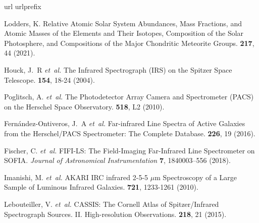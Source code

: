 \documentclass{nature2}
\begin{document}
\begin{thebibliography}{100}
\setcounter{enumiv}{45}

\expandafter\ifx\csname url\endcsname\relax
  \def\url#1{\texttt{#1}}\fi
\expandafter\ifx\csname urlprefix\endcsname\relax\def\urlprefix{URL }\fi
\providecommand{\bibinfo}[2]{#2}
\providecommand{\eprint}[2][]{\url{#2}}

\bibinfo{author}{Lodders, K.}
\newblock Relative Atomic Solar System Abundances, Mass Fractions, and Atomic Masses of the Elements and Their Isotopes, Composition of the Solar Photosphere, and Compositions of the Major Chondritic Meteorite Groups.
\newblock \emph{\bibinfo{journal}{\ssr}} \textbf{\bibinfo{volume}{217}},
  \bibinfo{pages}{44} (\bibinfo{year}{2021}).
  
\bibinfo{author}{{Houck}, J.~R} \emph{et~al.}
\newblock The Infrared Spectrograph (IRS) on the Spitzer Space Telescope.
\newblock \emph{\bibinfo{journal}{\apjs}} \textbf{\bibinfo{volume}{154}},
  \bibinfo{pages}{18-24} (\bibinfo{year}{2004}).
  
\bibinfo{author}{{Poglitsch}, A.} \emph{et~al.}
\newblock The Photodetector Array Camera and Spectrometer (PACS) on the Herschel Space Observatory.
\newblock \emph{\bibinfo{journal}{\aap}} \textbf{\bibinfo{volume}{518}},
\bibinfo{pages}{L2} (\bibinfo{year}{2010}).
  
\bibinfo{author}{{Fern{\'a}ndez-Ontiveros}, J.~A} 
\emph{et~al.}
\newblock Far-infrared Line Spectra of Active Galaxies from the Herschel/PACS Spectrometer: The Complete Database.
\newblock \emph{\bibinfo{journal}{\apjs}} \textbf{\bibinfo{volume}{226}},
\bibinfo{pages}{19} (\bibinfo{year}{2016}).

\bibinfo{author}{Fischer, C.} \emph{et~al.}
\newblock FIFI-LS: The Field-Imaging Far-Infrared Line Spectrometer on SOFIA.
\newblock \emph{\bibinfo{journal}{Journal of Astronomical Instrumentation}} \textbf{\bibinfo{volume}{7}},
\bibinfo{pages}{1840003--556} (\bibinfo{year}{2018}).

\bibinfo{author}{Imanishi, M.} \emph{et~al.}
\newblock AKARI IRC infrared 2-5-5 {\ensuremath{\mu}}m Spectroscopy of a Large Sample of Luminous Infrared Galaxies.
\newblock \emph{\bibinfo{journal}{\apj}} \textbf{\bibinfo{volume}{721}},
\bibinfo{pages}{1233-1261} (\bibinfo{year}{2010}).

\bibinfo{author}{Lebouteiller, V.} \emph{et~al.}
\newblock CASSIS: The Cornell Atlas of Spitzer/Infrared Spectrograph Sources. II. High-resolution Observations.
\newblock \emph{\bibinfo{journal}{\apjs}} \textbf{\bibinfo{volume}{218}},
\bibinfo{pages}{21} (\bibinfo{year}{2015}).


\end{thebibliography}
\end{document}
